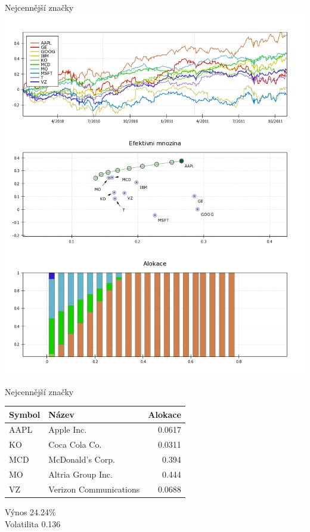 \begin{frame}{Nejcennější značky}
        \includegraphics[height=0.9\textheight]{brands1.png}
\end{frame}

\begin{frame}{Nejcennější značky}
      \begin{tabular}{|l|l|r|}
        \hline
        Symbol&Název&Alokace\\\hline\hline
        AAPL&Apple Inc. &0.0617\\\hline
        KO&Coca Cola Co. &0.0311\\\hline
        MCD&McDonald's Corp. &0.394\\\hline
        MO&Altria Group Inc. &0.444\\\hline
        VZ&Verizon Communications &0.0688\\\hline
      \end{tabular}
      
      Výnos 24.24\%\\
      Volatilita 0.136
\end{frame}

